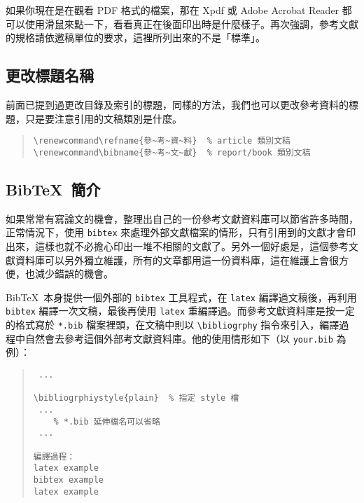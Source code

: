 如果你現在是在觀看 PDF 格式的檔案，那在 {\sffamily Xpdf} 或 \textsf{Adobe Acrobat Reader} 都可以使用滑鼠來點一下，看看真正在後面印出時是什麼樣子。再次強調，參考文獻的規格請依邀稿單位的要求，這裡所列出來的不是「標準」。

\subsection{更改標題名稱}

前面已提到過更改目錄及索引的標題，同樣的方法，我們也可以更改參考資料的標題，只是要注意引用的文稿類別是什麼。

\begin{quote}
  \begin{verbatim}
\renewcommand\refname{參~考~資~料}  % article 類別文稿
\renewcommand\bibname{參~考~文~獻}  % report/book 類別文稿
\end{verbatim}
\end{quote}

\subsection{Bib\TeX\ 簡介}
\label{subsec:bibtex}

如果常常有寫論文的機會，整理出自己的一份參考文獻資料庫可以節省許多時間，正常情況下，使用 \texttt{bibtex} 來處理外部文獻檔案的情形，只有引用到的文獻才會印出來，這樣也就不必擔心印出一堆不相關的文獻了。另外一個好處是，這個參考文獻資料庫可以另外獨立維護，所有的文章都用這一份資料庫，這在維護上會很方便，也減少錯誤的機會。

Bib\TeX\ 本身提供一個外部的 \texttt{bibtex} 工具程式，在 \texttt{latex} 編譯過文稿後，再利用 \texttt{bibtex} 編譯一次文稿，最後再使用 \texttt{latex} 重編譯過。而參考文獻資料庫是按一定的格式寫於 \texttt{*.bib} 檔案裡頭，在文稿中則以 \verb+\bibliogrphy+ 指令來引入，編譯過程中自然會去參考這個外部考文獻資料庫。他的使用情形如下（以 \texttt{your.bib} 為例）：

\begin{quote}
  \begin{verbatim}
 ...

\bibliogrphiystyle{plain}  % 指定 style 檔
 ...
    % *.bib 延伸檔名可以省略
 ...

編譯過程：
latex example
bibtex example
latex example
\end{verbatim}
\end{quote}


